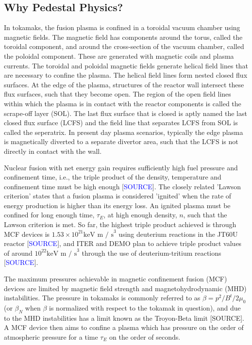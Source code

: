 \documentclass[a4paper, twoside, final, 12pt]{article}
\begin{document}
\subsection{Why Pedestal Physics?}\label{subsec:purpose}
In tokamaks, the fusion plasma is confined in a toroidal vacuum chamber using magnetic fields.
The magnetic field has components around the torus, called the toroidal component, and around the cross-section of the vacuum chamber, called the poloidal component.
These are generated with magnetic coils and plasma currents.
The toroidal and poloidal magnetic fields generate helical field lines that are necessary to confine the plasma.
The helical field lines form nested closed flux surfaces.
At the edge of the plasma, structures of the reactor wall intersect these flux surfaces, such that they become open.
The region of the open field lines within which the plasma is in contact with the reactor components is called the scrape-off layer (SOL).
The last flux surface that is closed is aptly named the last closed flux surface (LCFS) and the field line that separates LCFS from SOL is called the seperatrix.
In present day plasma scenarios, typically the edge plasma is magnetically diverted to a separate divertor area, such that the LCFS is not directly in contact with the wall.

Nuclear fusion with net energy gain requires sufficiently high fuel pressure and confinement time, i.e., the triple product of the density, temperature and confinement time must be high enough [\textcolor{blue}{SOURCE}].
The closely related 'Lawson criterion' states that a fusion plasma is considered 'ignited' when the rate of energy production is higher than its energy loss.
An ignited plasma must be confined for long enough time, $\tau_E$, at high enough density, $n$, such that the Lawson criterion is met.
So far, the highest triple product achieved is through MCF devices is $1.53\times 10^{21} \text{keV m / s}^3$ using deuterium reactions in the JT60U reactor [\textcolor{blue}{SOURCE}], and ITER and DEMO plan to achieve triple product values of around $10^{22}\text{keV m / s}^3$ through the use of deuterium-tritium reactions [\textcolor{blue}{SOURCE}].

The maximum pressures achievable in magnetic confinement fusion (MCF) devices are limited by magnetic field strength and magnetohydrodynamic (MHD) instabilities.
The pressure in tokamaks is commonly referred to as $\beta = p^2 / B^t / 2\mu_0$ (or $\beta_N$ when $\beta$ is normalized with respect to the tokamak in question), and due to the MHD instabilities has a limit known as the Troyon-Beta limit [SOURCE].
A MCF device then aims to confine a plasma which has pressure on the order of atmospheric pressure for a time $\tau_E$ on the order of seconds.
\end{document}
